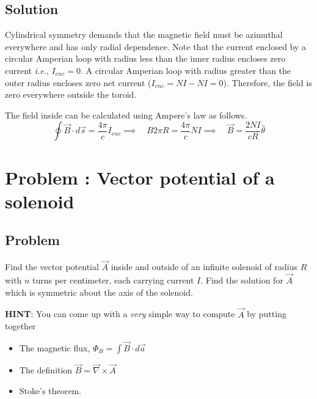 \documentclass[solutions]{esg8022pset}
\begin{document}
\subsection{Solution}
Cylindrical symmetry demands that the magnetic field must be azimuthal everywhere and has only radial dependence.
Note that the current enclosed by a circular
Amperian loop with radius less than the inner radius encloses zero current {\it i.e.}, $I_{enc} = 0$.
A circular Amperian loop with radius greater than the outer radius encloses zero net current ($I_{enc} = NI - NI = 0$). Therefore, the field is zero
everywhere outside the toroid.

The field inside can be calculated using Ampere's
law as follows.
$$\oint \vec{B} \cdot d\vec{s} = \frac{4\pi}{c}I_{enc}  \implies \quad B 2 \pi R
= \frac{4\pi}{c}NI  \implies \quad \vec{B} =
\frac{2NI}{cR}\hat{\theta} $$

\section{Problem \thesection: Vector potential of a solenoid }
\subsection{Problem}
Find the vector
potential $\vec A$ inside and outside of an infinite solenoid of
radius $R$ with $n$ turns per centimeter, each carrying current $I$.
Find the solution for $\vec A$ which is symmetric about the axis of
the solenoid.

{\bf HINT}: You can come up with a {\it very} simple way to compute
$\vec A$ by putting together

\begin{itemize}

\item The magnetic flux, $\Phi_B = \int \vec B\cdot d\vec a$

\item The definition $\vec B = \vec\nabla\times\vec A$

\item Stoke's theorem.
\end{itemize}
\end{document}
